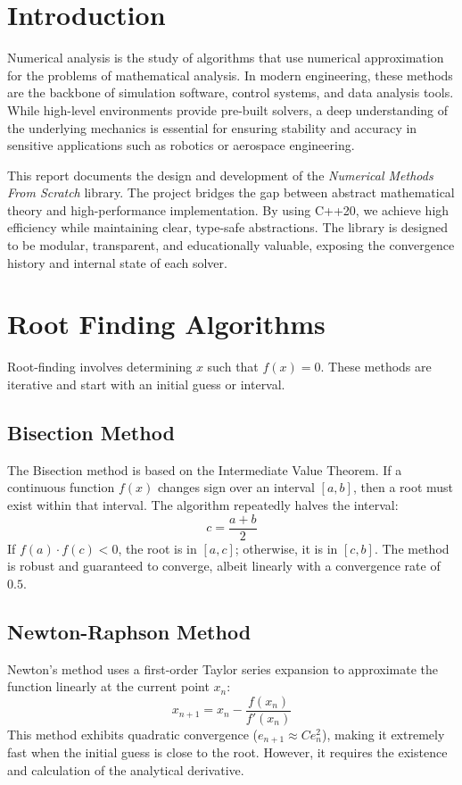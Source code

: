 \documentclass[11pt,a4paper]{article}
\begin{document}
\section{Introduction}
Numerical analysis is the study of algorithms that use numerical approximation for the problems of mathematical analysis. In modern engineering, these methods are the backbone of simulation software, control systems, and data analysis tools. While high-level environments provide pre-built solvers, a deep understanding of the underlying mechanics is essential for ensuring stability and accuracy in sensitive applications such as robotics or aerospace engineering.

This report documents the design and development of the \textit{Numerical Methods From Scratch} library. The project bridges the gap between abstract mathematical theory and high-performance implementation. By using C++20, we achieve high efficiency while maintaining clear, type-safe abstractions. The library is designed to be modular, transparent, and educationally valuable, exposing the convergence history and internal state of each solver.

\section{Root Finding Algorithms}
Root-finding involves determining $x$ such that $f(x) = 0$. These methods are iterative and start with an initial guess or interval.

\subsection{Bisection Method}
The Bisection method is based on the Intermediate Value Theorem. If a continuous function $f(x)$ changes sign over an interval $[a, b]$, then a root must exist within that interval. The algorithm repeatedly halves the interval:
\begin{equation}
    c = \frac{a+b}{2}
\end{equation}
If $f(a) \cdot f(c) < 0$, the root is in $[a, c]$; otherwise, it is in $[c, b]$. The method is robust and guaranteed to converge, albeit linearly with a convergence rate of $0.5$.

\subsection{Newton-Raphson Method}
Newton's method uses a first-order Taylor series expansion to approximate the function linearly at the current point $x_n$:
\begin{equation}
    x_{n+1} = x_n - \frac{f(x_n)}{f'(x_n)}
\end{equation}
This method exhibits quadratic convergence ($e_{n+1} \approx C e_n^2$), making it extremely fast when the initial guess is close to the root. However, it requires the existence and calculation of the analytical derivative.
\end{document}
